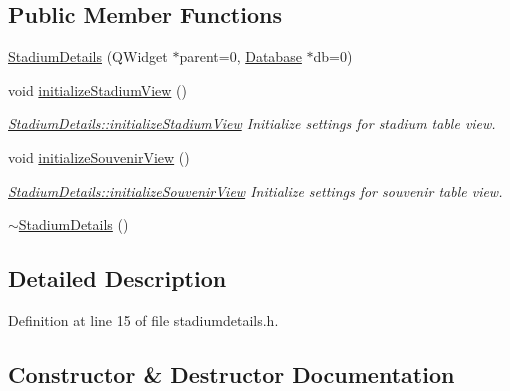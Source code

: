 \subsection*{Public Member Functions}
\begin{DoxyCompactItemize}
\item 
\hyperlink{class_stadium_details_a8879d228339f65e4685c03db50ae2856}{Stadium\+Details} (Q\+Widget $\ast$parent=0, \hyperlink{class_database}{Database} $\ast$db=0)
\item 
void \hyperlink{class_stadium_details_ad0399417bccb9ee2109ec5b5857b844c}{initialize\+Stadium\+View} ()
\begin{DoxyCompactList}\small\item\em \hyperlink{class_stadium_details_ad0399417bccb9ee2109ec5b5857b844c}{Stadium\+Details\+::initialize\+Stadium\+View} Initialize settings for stadium table view. \end{DoxyCompactList}\item 
void \hyperlink{class_stadium_details_ac5634fbdb4be32116854f7ddf55cb845}{initialize\+Souvenir\+View} ()
\begin{DoxyCompactList}\small\item\em \hyperlink{class_stadium_details_ac5634fbdb4be32116854f7ddf55cb845}{Stadium\+Details\+::initialize\+Souvenir\+View} Initialize settings for souvenir table view. \end{DoxyCompactList}\item 
\hyperlink{class_stadium_details_a8ace510be03c29948b2ced20ac056865}{$\sim$\+Stadium\+Details} ()
\end{DoxyCompactItemize}


\subsection{Detailed Description}


Definition at line 15 of file stadiumdetails.\+h.



\subsection{Constructor \& Destructor Documentation}
